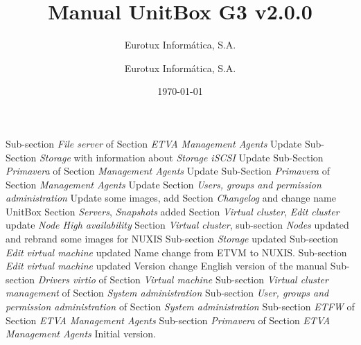 \documentclass[12pt,a4paper,english]{scrreprt}
\author{Eurotux Informática, S.A.}
\title{Manual UnitBox G3 v2.0.0}
\subtitle{Eurotux Informática, S.A.}
\date{\today}
\begin{document}
\maketitle

\begin{Log}
Sub-section \textit{File server} of Section \textit{ETVA Management Agents}
Update Sub-Section \textit{Storage} with information about \emph{Storage iSCSI}
Update Sub-Section \textit{Primavera} of Section \textit{Management Agents}
Update Sub-Section \textit{Primavera} of Section \textit{Management Agents}
Update Section \textit{Users, groups and permission administration}
Update some images, add Section \textit{Changelog} and change name UnitBox
Section \textit{Servers}, \textit{Snapshots} added
Section \textit{Virtual cluster}, \textit{Edit cluster} update \textit{Node High availability}
Section \textit{Virtual cluster}, sub-section \textit{Nodes} updated and rebrand some images for NUXIS
Sub-section \textit{Storage} updated 
Sub-section \textit{Edit virtual machine} updated 
Name change from ETVM to NUXIS. Sub-section \textit{Edit virtual machine} updated 
Version change
English version of the manual
Sub-section \textit{Drivers virtio} of Section \textit{Virtual machine}
Sub-section \textit{Virtual cluster management} of Section \textit{System administration}
Sub-section \textit{User, groups and permission administration} of Section \textit{System administration}
Sub-section \textit{ETFW} of Section \textit{ETVA Management Agents}
Sub-section \textit{Primavera} of Section \textit{ETVA Management Agents}
Initial version.
\end{Log}

\tableofcontents

\listoffigures


%
%




\end{document}
